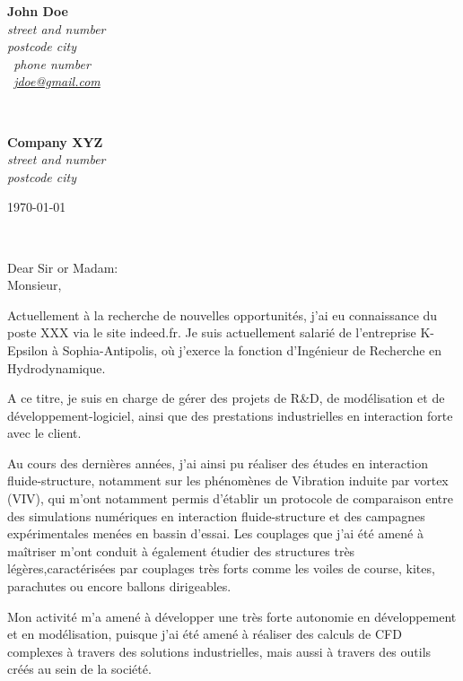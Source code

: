 \documentclass[11pt]{article}
\begin{document}
\sffamily   %
\hfill%
\begin{minipage}[t]{.6\textwidth}
\raggedleft%
{\bfseries John Doe}\\[.35ex]
\small\itshape%
street and number\\
postcode city\\[.35ex]
\Telefon~phone number\\
\Letter~\href{mailto:jdoe@gmail.com}{jdoe@gmail.com}
\end{minipage}\\[1em]
%
\begin{minipage}[t]{.4\textwidth}
\raggedright%
{\bfseries Company XYZ}\\[.35ex]
\small\itshape%
street and number\\
postcode city
\end{minipage}
\hfill %
\begin{minipage}[t]{.4\textwidth}
\raggedleft %
\today
\end{minipage}\\[2em]
\raggedright
Dear Sir or Madam:\\[1.5em]
%
Monsieur,

Actuellement à la recherche de nouvelles opportunités, j'ai eu connaissance du poste XXX via le site indeed.fr.
Je suis actuellement salarié de l'entreprise K-Epsilon à Sophia-Antipolis, où j'exerce la fonction d'Ingénieur de Recherche en Hydrodynamique.

A ce titre, je suis en charge de gérer des projets de R\&D, de modélisation et de développement-logiciel, ainsi que des prestations industrielles en interaction forte avec le client. 

Au cours des dernières années, j'ai ainsi pu réaliser des études en interaction fluide-structure, notamment sur les phénomènes de Vibration induite par vortex (VIV), qui m'ont notamment permis d'établir un protocole de comparaison entre des simulations numériques en interaction fluide-structure et des campagnes expérimentales menées en bassin d'essai. Les couplages que j'ai été amené à maîtriser m'ont conduit à également étudier des structures très légères,caractérisées par couplages très forts comme les voiles de course, kites, parachutes ou encore ballons dirigeables.

Mon activité m'a amené à développer une très forte autonomie en développement et en modélisation, puisque j'ai été amené à réaliser des calculs de CFD complexes à travers des solutions industrielles, mais aussi à travers des outils créés au sein de la société.
\end{document}

